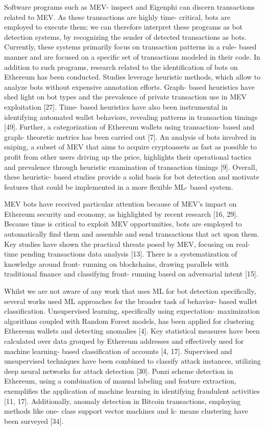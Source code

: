 Software programs such as MEV- inspect and Eigenphi can discern transactions related to MEV. As these transactions are highly time- critical, bots are employed to execute them; we can therefore interpret these programs as bot detection systems, by recognizing the sender of detected transactions as bots. Currently, these systems primarily focus on transaction patterns in a rule- based manner and are focused on a specific set of transactions modeled in their code. In addition to such programs, research related to the identification of bots on Ethereum has been conducted. Studies leverage heuristic methods, which allow to analyze bots without expensive annotation efforts. Graph- based heuristics have shed light on bot types and the prevalence of private transaction use in MEV exploitation [27]. Time- based heuristics have also been instrumental in identifying automated wallet behaviors, revealing patterns in transaction timings [49]. Further, a categorization of Ethereum wallets using transaction- based and graph- theoretic metrics has been carried out [7]. An analysis of bots involved in sniping, a subset of MEV that aims to acquire cryptoassets as fast as possible to profit from other users driving up the price, highlights their operational tactics and prevalence through heuristic examination of transaction timings [9]. Overall, these heuristic- based studies provide a solid basis for bot detection and motivate features that could be implemented in a more flexible ML- based system.

MEV bots have received particular attention because of MEV's impact on Ethereum security and economy, as highlighted by recent research [16, 29]. Because time is critical to exploit MEV opportunities, bots are employed to automatically find them and assemble and send transactions that act upon them. Key studies have shown the practical threats posed by MEV, focusing on real- time pending transactions data analysis [13]. There is a systematization of knowledge around front- running on blockchains, drawing parallels with traditional finance and classifying front- running based on adversarial intent [15].

Whilst we are not aware of any work that uses ML for bot detection specifically, several works used ML approaches for the broader task of behavior- based wallet classification. Unsupervised learning, specifically using expectation- maximization algorithms coupled with Random Forest models, has been applied for clustering Ethereum wallets and detecting anomalies [4]. Key statistical measures have been calculated over data grouped by Ethereum addresses and effectively used for machine learning- based classification of accounts [4, 17]. Supervised and unsupervised techniques have been combined to classify attack instances, utilizing deep neural networks for attack detection [30]. Ponzi scheme detection in Ethereum, using a combination of manual labeling and feature extraction, exemplifies the application of machine learning in identifying fraudulent activities [11, 17]. Additionally, anomaly detection in Bitcoin transactions, employing methods like one- class support vector machines and k- means clustering have been surveyed [34].

